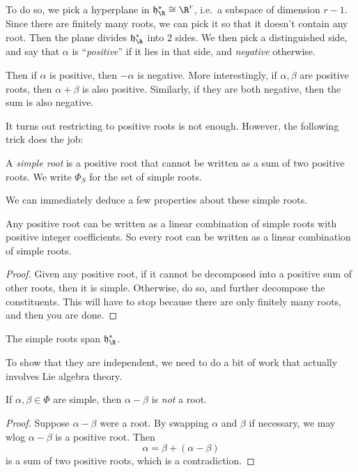 \documentclass[a4paper]{article}
\begin{document}
To do so, we pick a hyperplane in $\mathfrak{h}_\R^* \cong \R^r$, i.e.\ a subspace of dimension $r - 1$. Since there are finitely many roots, we can pick it so that it doesn't contain any root. Then the plane divides $\mathfrak{h}_\R^*$ into $2$ sides. We then pick a distinguished side, and say that $\alpha$ is ``\emph{positive}'' if it lies in that side, and \emph{negative} otherwise.

Then if $\alpha$ is positive, then $-\alpha $ is negative. More interestingly, if $\alpha, \beta$ are positive roots, then $\alpha + \beta$ is also positive. Similarly, if they are both negative, then the sum is also negative.

It turns out restricting to positive roots is not enough. However, the following trick does the job:

\begin{defi}
  A \emph{simple root} is a positive root that cannot be written as a sum of two positive roots. We write $\Phi_S$ for the set of simple roots.
\end{defi}

We can immediately deduce a few properties about these simple roots.
\begin{prop}
  Any positive root can be written as a linear combination of simple roots with positive integer coefficients. So every root can be written as a linear combination of simple roots.
\end{prop}

\begin{proof}
  Given any positive root, if it cannot be decomposed into a positive sum of other roots, then it is simple. Otherwise, do so, and further decompose the constituents. This will have to stop because there are only finitely many roots, and then you are done.
\end{proof}

\begin{cor}
  The simple roots span $\mathfrak{h}^*_{\R}$.
\end{cor}

To show that they are independent, we need to do a bit of work that actually involves Lie algebra theory.
\begin{prop}
  If $\alpha, \beta \in \Phi$ are simple, then $\alpha - \beta$ is \emph{not} a root.
\end{prop}

\begin{proof}
  Suppose $\alpha - \beta$ were a root. By swapping $\alpha$ and $\beta$ if necessary, we may wlog $\alpha - \beta$ is a positive root. Then
  \[
    \alpha = \beta + (\alpha - \beta)
  \]
  is a sum of two positive roots, which is a contradiction.
\end{proof}
\end{document}
